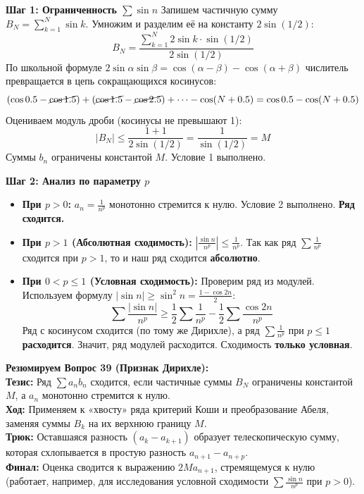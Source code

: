\textbf{Шаг 1: Ограниченность $\sum \sin n$}
Запишем частичную сумму $B_N = \sum_{k=1}^N \sin k$. Умножим и разделим её на константу $2\sin(1/2)$:
$$ B_N = \frac{\sum_{k=1}^N 2\sin k \cdot \sin(1/2)}{2\sin(1/2)} $$
По школьной формуле $2\sin\alpha\sin\beta = \cos(\alpha-\beta) - \cos(\alpha+\beta)$ числитель превращается в цепь сокращающихся косинусов:
$$ (\cos 0.5 - \cancel{\cos 1.5}) + (\cancel{\cos 1.5} - \cancel{\cos 2.5}) + \dots - \cos(N+0.5) = \cos 0.5 - \cos(N+0.5) $$
Оцениваем модуль дроби (косинусы не превышают 1):
$$ |B_N| \le \frac{1 + 1}{2\sin(1/2)} = \frac{1}{\sin(1/2)} = M $$
Суммы $b_n$ ограничены константой $M$. Условие 1 выполнено.

\textbf{Шаг 2: Анализ по параметру $p$}
\begin{itemize}
    \item \textbf{При $p > 0$:} $a_n = \frac{1}{n^p}$ монотонно стремится к нулю. Условие 2 выполнено. \textbf{Ряд сходится.}
    \item \textbf{При $p > 1$ (Абсолютная сходимость):} $\left|\frac{\sin n}{n^p}\right| \le \frac{1}{n^p}$. Так как ряд $\sum \frac{1}{n^p}$ сходится при $p>1$, то и наш ряд сходится \textbf{абсолютно}.
    \item \textbf{При $0 < p \le 1$ (Условная сходимость):} Проверим ряд из модулей. Используем формулу $|\sin n| \ge \sin^2 n = \frac{1 - \cos 2n}{2}$:
    $$ \sum \frac{|\sin n|}{n^p} \ge \frac{1}{2}\sum \frac{1}{n^p} - \frac{1}{2}\sum \frac{\cos 2n}{n^p} $$
    Ряд с косинусом сходится (по тому же Дирихле), а ряд $\sum \frac{1}{n^p}$ при $p \le 1$ \textbf{расходится}. Значит, ряд модулей расходится. Сходимость \textbf{только условная}.
\end{itemize}



\begin{tcolorbox}[colback=gray!5, colframe=black, boxrule=0.5pt, arc=0pt]
\textbf{Резюмируем Вопрос 39 (Признак Дирихле):} \\
\textbf{Тезис:} Ряд $\sum a_n b_n$ сходится, если частичные суммы $B_N$ ограничены константой $M$, а $a_n$ монотонно стремится к нулю. \\
\textbf{Ход:} Применяем к «хвосту» ряда критерий Коши и преобразование Абеля, заменяя суммы $B_k$ на их верхнюю границу $M$. \\
\textbf{Трюк:} Оставшаяся разность $(a_k - a_{k+1})$ образует телескопическую сумму, которая схлопывается в простую разность $a_{n+1} - a_{n+p}$. \\
\textbf{Финал:} Оценка сводится к выражению $2M a_{n+1}$, стремящемуся к нулю (работает, например, для исследования условной сходимости $\sum \frac{\sin n}{n^p}$ при $p > 0$).
\end{tcolorbox}






